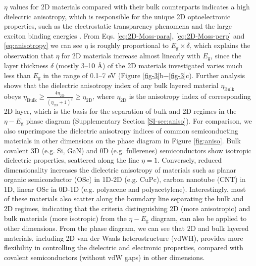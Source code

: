 \documentclass[journal=ancac3,manuscript=article,email=true,hyperref=true,keywords=false]{achemso}
\begin{document}
$\eta$ values for 2D materials compared with their bulk counterparts
indicates a high dielectric anisotropy, which is responsible for the
unique 2D optoelectronic properties, such as the electrostatic
transparency phenomena\cite{Liluhua_2014,Tian_2016,Li_2018} and the large exciton
binding energies
\cite{Pulci_2014,Tran_2014,Chernikov_2014_EB_MoS2_2D3D,Berkelbach_2013}. From
Eqs. \ref{eq:2D-Moss-para}, \ref{eq:2D-Moss-perp} and
\ref{eq:anisotropy} we can see $\eta$ is roughly proportional to
$E_{\mathrm{g}} \times \delta$, which explains the observation that
$\eta$ for 2D materials increase almost linearly with
$E_{\mathrm{g}}$, since the layer thickness $\delta$ (mostly 3--10
\AA{}) of the 2D materials investigated varies much less than
$E_{\mathrm{g}}$ in the range of 0.1--7 eV (Figure \ref{fig-3}b$-$\ref{fig-3}c). 
Further analysis shows that the dielectric anisotropy
index of any bulk layered material $\eta_{\mathrm{Bulk}}$ obeys
$\eta_{\mathrm{Bulk}} \geq {\displaystyle \frac{4
    \eta_{\mathrm{2D}}}{(\eta_{\mathrm{2D}}+1)^{2}}} \geq
\eta_{\mathrm{2D}}$, where $\eta_{\mathrm{2D}}$ is the anisotropy
index of corresponding 2D layer, which is the basis for the
separation of bulk and 2D regimes in the $\eta-E_{\mathrm{g}}$ phase
diagram (Supplementary Section \ref{SI-sec:aniso}).  
%
For comparison, we also superimpose the dielectric
anisotropy indices of common semiconducting materials in other
dimensions on
the phase diagram in Figure \ref{fig:aniso}. Bulk covalent 3D (e.g. Si, GaN) and 0D (e.g. fullerenes) semiconductors show isotropic
dielectric properties, scattered along the line $\eta=1$. 
%
Conversely, reduced dimensionality increases the dielectric anisotropy of
materials such as planar organic semiconductor (OSc) in 1D-2D 
(e.g. CuPc), carbon nanotube (CNT) in 1D, linear OSc in 0D-1D
(e.g. polyacene and polyacetylene). 
%
Interestingly, most of these
materials also scatter along the boundary line separating the bulk and
2D regimes, indicating that the criteria distinguishing 2D (more 
anisotropic) and bulk materials (more isotropic) from the
$\eta-E_{\mathrm{g}}$ diagram, can also be applied to other
dimensions. From the phase diagram, we can see that 2D and bulk
layered materials, including 2D van der Waals heterostructure
(vdWH)\cite{Novoselov_2016}, provides more flexibility in
controlling the dielectric and electronic properties, compared with
covalent semiconductors (without vdW gaps) in other dimensions.
\end{document}

